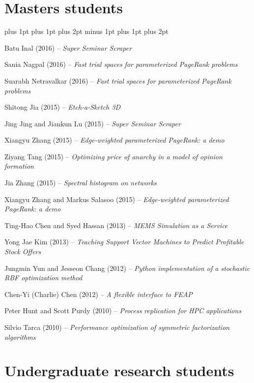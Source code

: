 \documentclass{article}
\newcounter{ecompactctr}
\newenvironment{ecompact}{
  \begin{list}{\arabic{ecompactctr}. }{
    \usecounter{ecompactctr}
    \parsep 0pt plus 1pt
    \partopsep 0pt plus 1pt
    \topsep 2pt plus 2pt minus 1pt
    \itemsep 0pt plus 1pt
    \parskip 0pt plus 2pt
    \leftmargin 0.3in}
       \raggedright}
  {\normalsize\end{list}}
\begin{document}
\section*{Masters students}

\begin{ecompact}
\item Batu Inal (2016) -- {\em Super Seminar Scraper}
\item Sania Nagpal (2016) --
  {\em Fast trial spaces for parameterized PageRank problems}
\item Suarabh Netravalkar (2016) --
  {\em Fast trial spaces for parameterized PageRank problems}
\item Shitong Jia (2015) -- {\em Etch-a-Sketch 3D}
\item Jing Jing and Jiankun Lu (2015) -- {\em Super Seminar Scraper}
\item Xiangyu Zhang (2015) -- {\em Edge-weighted parameterized PageRank: a demo}
\item Ziyang Tang (2015) -- {\em Optimizing price of anarchy in a
  model of opinion formation}
\item Jia Zhang (2015) -- {\em Spectral histogram on networks}
\item Xiangyu Zhang and Markus Salasoo (2015) -- {\em Edge-weighted parameterized PageRank: a demo}
\item
  Ting-Hao Chen and Syed Hassan (2013) -- {\em MEMS Simulation as a Service}
\item
  Yong Jae Kim (2013) -- {\em Teaching Support Vector Machines to
    Predict Profitable Stock Offers}
\item
  Jungmin Yun and Jesseon Chang (2012) -- {\em Python implementation
    of a stochastic RBF optimization method}
\item
  Chen-Yi (Charlie) Chen (2012) -- {\em A flexible interface to FEAP}
\item
  Peter Hunt and Scott Purdy (2010) -- {\em Process replication for
    HPC applications}
\item
  Silvio Tarca (2010) -- {\em Performance optimization of symmetric
    factorization algorithms}
\end{ecompact}

\section*{Undergraduate research students}
\end{document}
